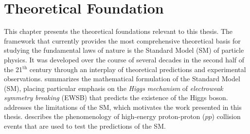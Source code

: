 \chapter{Theoretical Foundation}
\label{chap:theory}

This chapter presents the theoretical foundations relevant to this thesis.  
The framework that currently provides the most comprehensive theoretical basis for studying the fundamental laws of nature is the Standard Model (SM) of particle physics.
It was developed over the course of several decades in the second half of the 21$^{\text{th}}$ century through an interplay of theoretical predictions and experimental observations.
 summarizes the mathematical formulation of the Standard Model (SM), placing particular emphasis on the \emph{Higgs mechanism} of \emph{electroweak symmetry breaking} (EWSB) that predicts the existence of the Higgs boson.
 addresses the limitations of the SM, which motivates the work presented in this thesis. 
 describes the phenomenology of high-energy proton-proton ($pp$) collision events that are used to test the predictions of the SM.



